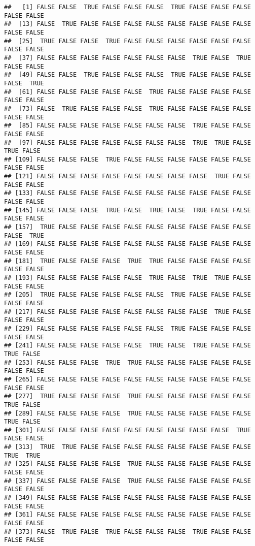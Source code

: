 \documentclass[
]{book}
\begin{document}
\begin{verbatim}
##   [1] FALSE FALSE  TRUE FALSE FALSE FALSE  TRUE FALSE FALSE FALSE FALSE FALSE
##  [13] FALSE  TRUE FALSE FALSE FALSE FALSE FALSE FALSE FALSE FALSE FALSE FALSE
##  [25]  TRUE FALSE FALSE  TRUE FALSE FALSE FALSE FALSE FALSE FALSE FALSE FALSE
##  [37] FALSE FALSE FALSE FALSE FALSE FALSE FALSE  TRUE FALSE  TRUE FALSE FALSE
##  [49] FALSE FALSE  TRUE FALSE FALSE FALSE  TRUE FALSE FALSE FALSE FALSE  TRUE
##  [61] FALSE FALSE FALSE FALSE FALSE  TRUE FALSE FALSE FALSE FALSE FALSE FALSE
##  [73] FALSE  TRUE FALSE FALSE FALSE  TRUE FALSE FALSE FALSE FALSE FALSE FALSE
##  [85] FALSE FALSE FALSE FALSE FALSE FALSE FALSE  TRUE FALSE FALSE FALSE FALSE
##  [97] FALSE FALSE FALSE FALSE FALSE FALSE FALSE  TRUE  TRUE FALSE  TRUE FALSE
## [109] FALSE FALSE FALSE  TRUE FALSE FALSE FALSE FALSE FALSE FALSE FALSE FALSE
## [121] FALSE FALSE FALSE FALSE FALSE FALSE FALSE FALSE  TRUE FALSE FALSE FALSE
## [133] FALSE FALSE FALSE FALSE FALSE FALSE FALSE FALSE FALSE FALSE FALSE FALSE
## [145] FALSE FALSE FALSE  TRUE FALSE  TRUE FALSE  TRUE FALSE FALSE FALSE FALSE
## [157]  TRUE FALSE FALSE FALSE FALSE FALSE FALSE FALSE FALSE FALSE FALSE  TRUE
## [169] FALSE FALSE FALSE FALSE FALSE FALSE FALSE FALSE FALSE FALSE FALSE FALSE
## [181]  TRUE FALSE FALSE FALSE  TRUE  TRUE FALSE FALSE FALSE FALSE FALSE FALSE
## [193] FALSE FALSE FALSE FALSE FALSE  TRUE FALSE  TRUE  TRUE FALSE FALSE FALSE
## [205]  TRUE FALSE FALSE FALSE FALSE FALSE  TRUE FALSE FALSE FALSE FALSE FALSE
## [217] FALSE FALSE FALSE FALSE FALSE FALSE FALSE FALSE  TRUE FALSE FALSE FALSE
## [229] FALSE FALSE FALSE FALSE FALSE FALSE  TRUE FALSE FALSE FALSE FALSE FALSE
## [241] FALSE FALSE FALSE FALSE FALSE  TRUE FALSE  TRUE FALSE FALSE  TRUE FALSE
## [253] FALSE FALSE FALSE  TRUE  TRUE FALSE FALSE FALSE FALSE FALSE FALSE FALSE
## [265] FALSE FALSE FALSE FALSE FALSE FALSE FALSE FALSE FALSE FALSE FALSE FALSE
## [277]  TRUE FALSE FALSE FALSE  TRUE FALSE FALSE FALSE FALSE FALSE  TRUE FALSE
## [289] FALSE FALSE FALSE FALSE  TRUE FALSE FALSE FALSE FALSE FALSE  TRUE FALSE
## [301] FALSE FALSE FALSE FALSE FALSE FALSE FALSE FALSE FALSE  TRUE FALSE FALSE
## [313]  TRUE  TRUE FALSE FALSE FALSE FALSE FALSE FALSE FALSE FALSE  TRUE  TRUE
## [325] FALSE FALSE FALSE FALSE  TRUE FALSE FALSE FALSE FALSE FALSE FALSE FALSE
## [337] FALSE FALSE FALSE FALSE  TRUE FALSE FALSE FALSE FALSE FALSE FALSE FALSE
## [349] FALSE FALSE FALSE FALSE FALSE FALSE FALSE FALSE FALSE FALSE FALSE FALSE
## [361] FALSE FALSE FALSE FALSE FALSE FALSE FALSE FALSE FALSE FALSE FALSE FALSE
## [373] FALSE  TRUE FALSE  TRUE FALSE FALSE FALSE  TRUE FALSE FALSE FALSE FALSE

\end{verbatim}
\end{document}
